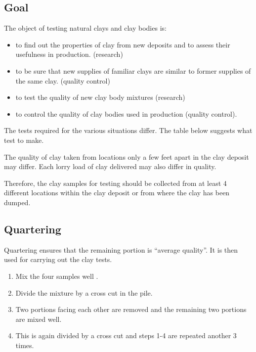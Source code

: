 \subsection{Goal}
The object of testing natural clays and clay bodies is:
\begin{itemize}
\item to find out the properties of clay from new deposits and to assess their 
usefulness in production. (research)
\item to be sure that new supplies of familiar clays are similar to former 
supplies of the same clay. (quality control)
\item to test the quality of new clay body mixtures (research)
\item to control the quality of clay bodies used in production (quality 
control).
\end{itemize}
The tests required for the various situations differ. The table below suggests 
what test to make.

The quality of clay taken from locations only a few feet apart in the clay 
deposit may differ. Each lorry load of clay delivered may also differ in 
quality.

Therefore, the clay samples for testing should be collected from at least 4 
different locations within the clay deposit or from where the clay has been 
dumped.
\subsection{Quartering}
Quartering ensures that the remaining portion is ``average quality''. It is 
then used for carrying out the clay tests.
\begin{enumerate}
\item Mix the four samples well .
\item Divide the mixture by a cross cut in the pile.
\item Two portions facing each other are removed and the remaining two portions 
are mixed well.
\item This is again divided by a cross cut and steps 1-4 are repeated another 3 
times.
\end{enumerate}
